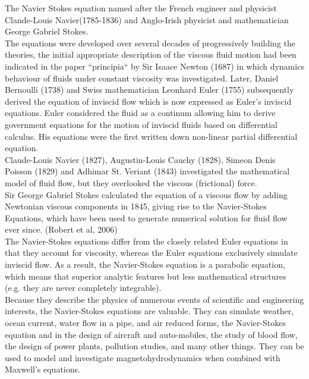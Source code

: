 \documentclass[11pt]{report}
\begin{document}
	The Navier Stokes equation named after the French engineer and physicist Clande-Louis Navier(1785-1836) and Anglo-Irish physicist and mathematician George Gabriel Stokes.\\
	
	The equations were developed over several decades of progressively building the theories, the initial appropriate description of the viscous fluid motion had been indicated in the paper ``principia`` by Sir Isaace Newton (1687) in which dynamics behaviour 	of fluids under constant viscosity was investigated. Later, Daniel Bernoulli (1738) and Swiss mathematician Leonhard Euler (1755) subsequently derived the equation of inviscid flow which is now expressed as Euler's inviscid equations. Euler considered the fluid as a continum allowing him to derive government equations for the motion of inviscid fluids based on differential calculus. His equations were the first written down non-linear partial differential equation.\\
	
	Claude-Louis Navier (1827), Augustin-Louis Cauchy (1828), Simeon Denis Poisson (1829) and Adhimar St. Veriant (1843) investigated the mathematical model of fluid flow, but they overlooked the viscous (frictional) force.\\
	
	Sir George Gabriel Stokes calculated the equation of a viscous flow by adding Newtonian viscous components in 1845, giving rise to the Navier-Stokes Equations, which have been used to generate numerical solution for fluid flow ever since. (Robert et al, 2006)\\
	
	The Navier-Stokes equations differ from the closely related Euler equations in that they account for viscosity, whereas the Euler equations exclusively simulate inviscid flow. As a result, the Navier-Stokes equation is a parabolic equation, which means that superior analytic features but less mathematical structures (e.g. they are never completely integrable).\\
	
	Because they describe the physics of numerous events of scientific and engineering interests, the Navier-Stokes equations are valuable. They can simulate weather, ocean current, water flow in a pipe, and air reduced forms, the Navier-Stokes equation and in the design of aircraft and auto-mobiles, the study of blood flow, the design of power plants, pollution studies, and many other things. They can be used to model and investigate magnetohydrodynamics when combined with Maxwell's equations.\\
	
\end{document}
